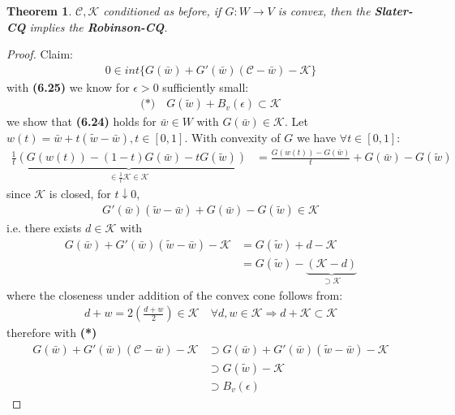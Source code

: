 \documentclass[a4paper,11pt,fleqn]{book}
\newtheorem{theorem}{Theorem}[section]
\theoremstyle{definition}
\theoremstyle{remark}
\begin{document}
\begin{theorem}
	$\mathcal{C}, \mathcal{K}$ conditioned as before, if $G:W \rightarrow V $ is convex, then the \textbf{Slater-CQ} implies the \textbf{Robinson-CQ}.
\end{theorem}
\begin{proof}
Claim:
\begin{align*}
	0 \in int\{ G(\bar{w}) + G'(\bar{w}) (\mathcal{C} - \bar{w}) - \mathcal{K}\}
\end{align*}
	with \textbf{(6.25)} we know for $\epsilon > 0$ sufficiently small:
	\begin{align*}
	    \textbf{(*)} \quad
		G(\tilde{w}) + B_v(\epsilon) \subset \mathcal{K}
	\end{align*}
	we show that \textbf{(6.24)} holds for $\bar{w} \in W$ with $G(\bar{w}) \in \mathcal{K}$. Let $w(t) = \bar{w} + t(\tilde{w} - \bar{w}), t \in [0, 1]$. With convexity of $G$ we have $\forall t \in [0, 1]:$
	\begin{align*}
		\underbrace{\frac{1}{t}(G(w(t)) - (1 - t)G(\bar{w}) - tG(\tilde{w}))}_{\in \frac{1}{t} \mathcal{K} \in \mathcal{K}}
		&= \frac{G(w(t)) - G(\bar{w})}{t} + G(\bar{w}) - G(\tilde{w})
	\end{align*}
	since $\mathcal{K}$ is closed, for $t \downarrow 0$, 
	\begin{align*}
		G'(\bar{w}) (\tilde{w} - \bar{w}) + G(\bar{w}) - G(\tilde{w}) \in \mathcal{K}
	\end{align*}
	i.e. there exists $d \in \mathcal{K}$ with 
	\begin{align*}
		G(\bar{w}) + G'(\bar{w})(\tilde{w} - \bar{w}) - \mathcal{K}
		&= G(\tilde{w}) + d - \mathcal{K} \\
		&= G(\tilde{w}) - \underbrace{ (\mathcal{K} - d) }_{\supset \mathcal{K}}
	\end{align*}
	where the closeness under addition of the convex cone follows from:
	\begin{align*}
		d + w = 2 (\frac{d + w}{2}) \in \mathcal{K} \quad \forall d, w \in \mathcal{K} \Rightarrow d + \mathcal{K} \subset \mathcal{K}
	\end{align*}
	therefore with \textbf{(*)}
	\begin{align*}
		G(\bar{w}) + G'(\bar{w}) (\mathcal{C} - \bar{w}) - \mathcal{K} 
		&\supset G(\bar{w}) + G'(\bar{w})(\tilde{w} - \bar{w}) - \mathcal{K}\\
		&\supset G(\tilde{w}) - \mathcal{K}\\
		&\supset B_v(\epsilon)
	\end{align*}
\end{proof}
\end{document}
